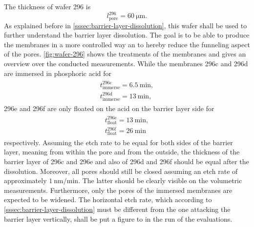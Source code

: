 \documentclass[thesis.tex]{subfiles}
\begin{document}
      The thickness of wafer 296 is
      \begin{equation}
          l^{296}_\mathrm{pore}=\SI{60}{\micro\meter}.
      \end{equation}
      As explained before in \cref{sssec:barrier-layer-dissolution}, this wafer shall be used to further understand the barrier layer dissolution. The goal is to be able to produce the membranes in a more controlled way an to hereby reduce the funneling aspect of the pores. \cref{fig:wafer-296} shows the treatments of the membranes and gives an overview over the conducted measurements. While the membranes 296c and 296d are immersed in phosphoric acid for
      \begin{align}
          \begin{split}
              t^\mathrm{296c}_\mathrm{immerse}=\SI{6,5}{\minute},    \\
              t^\mathrm{296d}_\mathrm{immerse}=\SI{13}{\minute},
          \end{split}
          \label{eq:t-immerse}
      \end{align}
      296e and 296f are only floated on the acid on the barrier layer side for
      \begin{align}
          \begin{split}
              t^\mathrm{296e}_\mathrm{float}=\SI{13}{\minute}, \\
              t^\mathrm{296f}_\mathrm{float}=\SI{26}{\minute}
          \end{split}
          \label{eq:t-float}
      \end{align}
      respectively. Assuming the etch rate to be equal for both sides of the barrier layer, meaning from within the pore and from the outside, the thickness of the barrier layer of 296c and 296e and also of 296d and 296f should be equal after the dissolution. Moreover, all pores should still be closed assuming an etch rate of approximately $\SI{1}{\nano\meter\per\minute}$. The latter should be clearly visible on the volumetric measurements. Furthermore, only the pores of the immersed membranes are expected to be widened. The horizontal etch rate, which according to \cref{sssec:barrier-layer-dissolution} must be different from the one attacking the barrier layer vertically, shall be put a figure to in the run of the evaluations.

      
\end{document}
